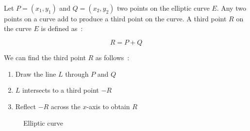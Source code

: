 Let $P = (x_1, y_1)$ and $Q = (x_2, y_2)$ two points on the elliptic curve $E$. Any two points on a curve add to produce a third point on the curve. A third point $R$ on the curve $E$ is defined as~\cite{elliptic_curves}:

\begin{equation*}
  R = P + Q
\end{equation*}

We can find the third point $R$ as follows~\cite{elliptic_curves}:

\begin{enumerate}
  \item Draw the line $L$ through $P$ and $Q$
  \item $L$ intersects to a third point $-R$
  \item Reflect $-R$ across the $x$-axis to obtain $R$
\end{enumerate}

\begin{figure}
  \centering
  \caption{Elliptic curve}
\end{figure}

